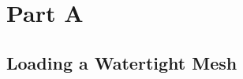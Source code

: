 \documentclass{report}
\begin{document}
\chapter{Part A}
\section{Loading a Watertight Mesh}
\end{document}
